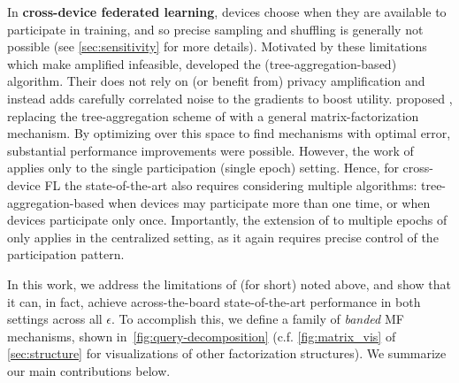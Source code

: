 \documentclass{article}
\begin{document}
In \textbf{cross-device federated learning}, devices choose when they are available to participate in training, and so precise sampling and shuffling is generally not possible (see \cref{sec:sensitivity} for more details).
Motivated by these limitations which make amplified \DPSGD infeasible, \citet{kairouz2021practical} developed the (tree-aggregation-based) \DPFTRL algorithm.   Their \DPFTRL does not rely on (or benefit from) privacy amplification and instead adds carefully correlated noise to the gradients to boost utility.  \citet{denisov22matfact} proposed \MFFTRL, replacing the tree-aggregation scheme of \citet{kairouz2021practical} with a general matrix-factorization mechanism. By optimizing over this space to find mechanisms with optimal error, substantial performance improvements were possible. However, the work of \citet{denisov22matfact} applies only to the single participation (single epoch) setting. Hence, for cross-device FL the state-of-the-art also requires considering multiple algorithms: tree-aggregation-based \DPFTRL when devices may participate more than one time, or \MFFTRL when devices participate only once. Importantly, the extension of \MFFTRL to multiple epochs of \citet{choquette2022multi} only applies in the centralized setting, as it again requires precise control of the participation pattern.  

In this work, we address the limitations of \MFFTRL (\MF for short) noted above, and show that it can, in fact, achieve across-the-board state-of-the-art performance in both settings across all $\epsilon$. To accomplish this, we define a family of \emph{banded} MF mechanisms, shown in~\cref{fig:query-decomposition} (c.f. \cref{fig:matrix_vis} of \cref{sec:structure} for visualizations of other factorization structures). We summarize our main contributions below.
\end{document}
